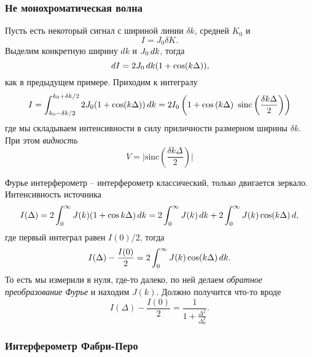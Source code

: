 \subsubsection*{Не монохроматическая волна}
Пусть есть некоторый сигнал с шириной линии $\delta k$, средней $K_0$ и
\begin{equation*}
    I = J_0 \delta K.
\end{equation*}
Выделим конкретную ширину $d k$ и $J_0 \, d k$, тогда
\begin{equation*}
    \, d I =2 J_0 \, d k (1 + \cos (k \Delta)),
\end{equation*}
как в предыдущем примере. Приходим к интегралу
\begin{equation*}
    I = \int_{k_0-\delta k/2}^{k_0 + \delta k /2} 
    2 J_0 (1 + \cos(k \Delta)) \, d k = 
    2 I_0 \left(1 + \cos\left( k \Delta\right) \ \text{sinc} \left(\frac{\delta k \Delta}{2}\right)\right)
\end{equation*}
где мы складываем интенсивности в силу приличности размерном ширины $\delta k$.
При этом \textit{видность}
\begin{equation*}
    V = \bigg| \text{sinc} \left(
        \frac{\delta k \Delta}{2}
    \right)
    \bigg|
\end{equation*}

Фурье интерферометр -- интерферометр классический, только двигается зеркало. Интенсивность источника
\begin{equation*}
    I(\Delta) = 
    2 \int_0^\infty
    J(k) (1 + \cos k \Delta) \, d k = 
    2 \int_0^{\infty} J(k) \, d k + 
    2 \int_0^\infty 
    J(k) \cos (k \Delta) \, d,
\end{equation*}
где первый интеграл равен $I(0)/2$, тогда
\begin{equation*}
    I(\Delta) - \frac{I(0)}{2} = 2 \int_0^{\infty} J(k) \cos (k \Delta) \, d k.
\end{equation*}
То есть мы измерили в нуля, где-то далеко, по ней делаем \textit{обратное преобразование Фурье} и находим $J(k)$.
Должно получится что-то вроде
\begin{equation*}
    I(\Delta) - \frac{I(0)}{2} = \frac{1}{1+\frac{\Delta^2}{\Delta^2_0}}.
\end{equation*}


\subsubsection*{Интерферометр Фабри-Перо}

